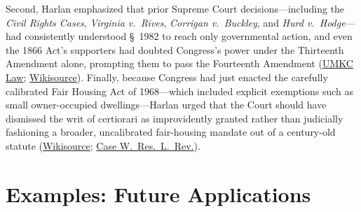 \documentclass[12pt]{article}
\begin{document}
Second, Harlan emphasized that prior Supreme Court decisions---including the \textit{Civil Rights Cases}, \textit{Virginia v.\ Rives}, \textit{Corrigan v.\ Buckley}, and \textit{Hurd v.\ Hodge}---had consistently understood \S~1982 to reach only governmental action, and even the 1866 Act's supporters had doubted Congress's power under the Thirteenth Amendment alone, prompting them to pass the Fourteenth Amendment (\href{http://law2.umkc.edu/faculty/projects/ftrials/conlaw/mayer.html}{UMKC Law}; \href{https://en.wikisource.org/wiki/Jones_v._Mayer/Dissent_Harlan}{Wikisource}). Finally, because Congress had just enacted the carefully calibrated Fair Housing Act of 1968---which included explicit exemptions such as small owner-occupied dwellings---Harlan urged that the Court should have dismissed the writ of certiorari as improvidently granted rather than judicially fashioning a broader, uncalibrated fair-housing mandate out of a century-old statute (\href{https://en.wikisource.org/wiki/Jones_v._Mayer/Dissent_Harlan}{Wikisource}; \href{https://scholarlycommons.law.case.edu/cgi/viewcontent.cgi?params=/context/caselrev/article/2719/&path_info=29_20CaseWResLRev448_1968_1969_.pdf}{Case W.\ Res.\ L.\ Rev.}).

\section{Examples: Future Applications}
\end{document}
